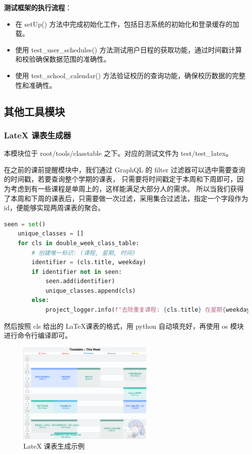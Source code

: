 \documentclass[14pt,a4paper,UTF8,twoside]{article}
\renewcommand{\texttt}[1]{{\color{blue}\ttfamily#1}}
\begin{document}
\textbf{测试框架的执行流程}：
\begin{itemize}
    \item 在 \texttt{setUp()} 方法中完成初始化工作，包括日志系统的初始化和登录缓存的加载。
    \item 使用 \texttt{test\_user\_schedules()} 方法测试用户日程的获取功能，通过时间戳计算和校验确保数据范围的准确性。
    \item 使用 \texttt{test\_school\_calendar()} 方法验证校历的查询功能，确保校历数据的完整性和准确性。
\end{itemize}

\subsection{其他工具模块}

\subsubsection{LateX 课表生成器}

本模块位于 \texttt{root/tools/classtable} 之下。对应的测试文件为 \texttt{test/test\_latex}。

在之前的课前提醒模块中，我们通过 GraphQL 的 filter 过滤器可以选中需要查询的时间戳，若要查询整个学期的课表，
只需要将时间戳定于本周和下周即可，因为考虑到有一些课程是单周上的，这样能满足大部分人的需求。
所以当我们获得了本周和下周的课表后，只需要做一次过滤，采用集合过滤法，指定一个字段作为 id，便能够实现两周课表的聚合。

\begin{lstlisting}[language = python]
    seen = set()
    unique_classes = []
    for cls in double_week_class_table:
        # 创建唯一标识: (课程, 星期, 时间)
        identifier = (cls.title, weekday)
        if identifier not in seen:
            seen.add(identifier)
            unique_classes.append(cls)
        else:
            project_logger.info(f"去除重复课程: {cls.title} 在星期{weekday + 1} {class_time}")
\end{lstlisting}

然后按照 cls 给出的 \LaTeX 课表的格式，用 python 自动填充好，再使用 os 模块进行命令行编译即可。

\begin{figure}[H]
    \centering
    \includegraphics[width=0.6\textwidth]{img/classtable_example.png}
    \caption{LateX 课表生成示例}
    \label{fig:latex_table}
\end{figure}
\end{document}
